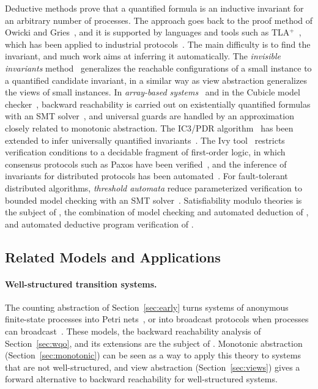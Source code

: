 Deductive methods prove that a quantified formula is an inductive invariant
for an arbitrary number of processes. The approach goes back to the proof method of
Owicki and Gries~\cite{OG76}, and it is supported by languages and tools such
as TLA$^+$~\cite{Lam94,Lam02,CDLMRV12}, which has been applied to industrial
protocols~\cite{NRZBMD15}. The main difficulty is to find the invariant, and
much work aims at inferring it automatically. The \emph{invisible invariants}
method~\cite{PRZ01,APRXZ01} generalizes the reachable configurations of a
small instance to a quantified candidate invariant, in a similar way as view
abstraction generalizes the views of small instances. In \emph{array-based
systems}~\cite{GR10,GS10} and in the Cubicle model checker~\cite{CGKMZ12,CGKMZ13},
backward reachability is carried out on existentially quantified formulas with
an SMT solver~\cite{BSST09}, and universal guards are handled by an
approximation closely related to monotonic abstraction. The IC3/PDR
algorithm~\cite{Bra11,EMB11} has been extended to infer universally quantified
invariants~\cite{KBIRS17,GSM16}. The Ivy tool~\cite{PMPSS16} restricts
verification conditions to a decidable fragment of first-order logic, in which
consensus protocols such as Paxos have been verified~\cite{PLSS17}, and the
inference of invariants for distributed protocols has been
automated~\cite{MGJKKS19,KPIA20}. For fault-tolerant distributed algorithms,
\emph{threshold automata} reduce parameterized verification to bounded model
checking with an SMT solver~\cite{JKSVW13,KVW17,KLVW17}. Satisfiability modulo
theories is the subject of , the combination of model checking and
automated deduction of , and automated deductive program
verification of .

\subsection{Related Models and Applications}

\paragraph{Well-structured transition systems.}
The counting abstraction of Section~\ref{sec:early} turns systems of anonymous
finite-state processes into Petri nets~\cite{GerSis92}, or into broadcast
protocols when processes can broadcast~\cite{EFM99,Del00}. These models, the
backward reachability analysis of Section~\ref{sec:wqo}, and its extensions are
the subject of . Monotonic abstraction (Section~\ref{sec:monotonic})
can be seen as a way to apply this theory to systems that are not
well-structured, and view abstraction (Section~\ref{sec:views}) gives a forward
alternative to backward reachability for well-structured systems.

